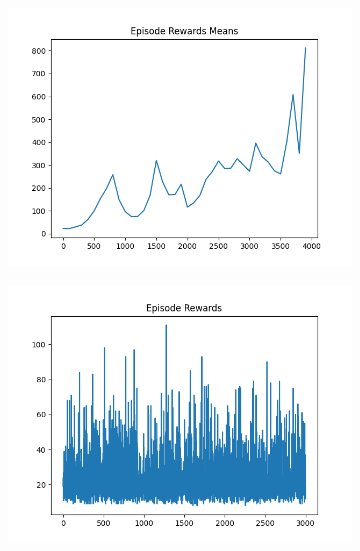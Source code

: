\begin{figure}[H]
\begin{subfigure}{.47\linewidth}
        \includegraphics[width=\textwidth]{pole/2024-06-14_11-09-14_dqn_cartpole_episode_rewards_means.png}
    \end{subfigure}
    \begin{subfigure}{.47\linewidth}
        \centering
        \includegraphics[width=\textwidth]{pole/2024-06-13_18-59-17_dqn_cartpole_episode_rewards.png}
    \end{subfigure}
\end{figure}
